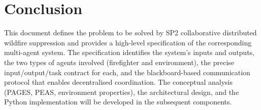 \documentclass[a4paper, 11pt]{article}
\begin{document}
\section{Conclusion}

This document defines the problem to be solved by SP2 collaborative
distributed wildfire suppression and provides a high-level
specification of the corresponding multi-agent system. The specification
identifies the system's inputs and outputs, the two types of agents
involved (firefighter and environment), the precise input/output/task
contract for each, and the blackboard-based communication protocol that
enables decentralised coordination. The conceptual analysis (PAGES, PEAS,
environment properties), the architectural design, and the Python
implementation will be developed in the subsequent components.
\end{document}
